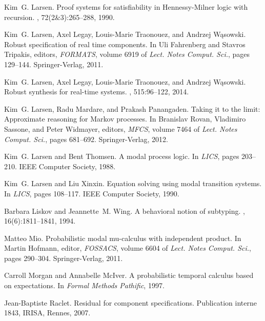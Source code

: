 \documentclass[twocolumn]{svjour3-dummy}
\begin{document}
\begin{thebibliography}{10}
Kim~G. Larsen.
\newblock Proof systems for satisfiability in {H}ennessy-{M}ilner logic with
  recursion.
, 72(2{\&}3):265--288, 1990.

Kim~G. Larsen, Axel Legay, Louis-Marie Traonouez, and Andrzej W{\k a}sowski.
\newblock Robust specification of real time components.
\newblock In Uli Fahrenberg and Stavros Tripakis, editors, {\em FORMATS},
  volume 6919 of {\em {Lect. Notes Comput. Sci.}}, pages 129--144.
  {Springer-Verlag}, 2011.

Kim~G. Larsen, Axel Legay, Louis-Marie Traonouez, and Andrzej W{\k a}sowski.
\newblock Robust synthesis for real-time systems.
, 515:96--122, 2014.

Kim~G. Larsen, Radu Mardare, and Prakash Panangaden.
\newblock Taking it to the limit: Approximate reasoning for {M}arkov processes.
\newblock In Branislav Rovan, Vladimiro Sassone, and Peter Widmayer, editors,
  {\em MFCS}, volume 7464 of {\em {Lect. Notes Comput. Sci.}}, pages 681--692.
  {Springer-Verlag}, 2012.

Kim~G. Larsen and Bent Thomsen.
\newblock A modal process logic.
\newblock In {\em LICS}, pages 203--210. IEEE Computer Society, 1988.

Kim~G. Larsen and Liu Xinxin.
\newblock Equation solving using modal transition systems.
\newblock In {\em LICS}, pages 108--117. IEEE Computer Society, 1990.

Barbara Liskov and Jeannette~M. Wing.
\newblock A behavioral notion of subtyping.
, 16(6):1811--1841, 1994.

Matteo Mio.
\newblock Probabilistic modal mu-calculus with independent product.
\newblock In Martin Hofmann, editor, {\em FOSSACS}, volume 6604 of {\em {Lect.
  Notes Comput. Sci.}}, pages 290--304. {Springer-Verlag}, 2011.

Carroll Morgan and Annabelle McIver.
\newblock A probabilistic temporal calculus based on expectations.
\newblock In {\em Formal Methods Pathific}, 1997.

Jean-Baptiste Raclet.
\newblock Residual for component specifications.
\newblock Publication interne 1843, IRISA, Rennes, 2007.


\end{thebibliography}
\end{document}
